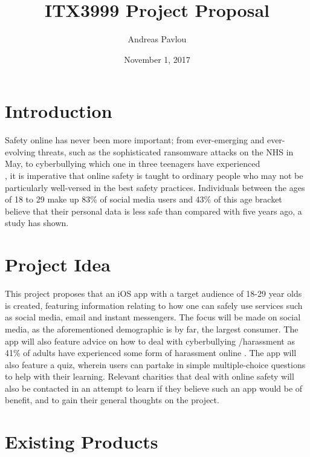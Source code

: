 \documentclass{article}
\author{Andreas Pavlou}
\title{ITX3999 Project Proposal}
\date{November 1, 2017}
\begin{document}
\maketitle
\newpage



\section{Introduction}

Safety online has never been more important; from ever-emerging and ever-evolving threats, such as the sophisticated ransomware attacks on the NHS in May, to cyberbullying which one in three teenagers have experienced \\
\cite{association_number_2014}, it is imperative that online safety is taught to ordinary people who may not be particularly well-versed in the best safety practices. Individuals between the ages of 18 to 29 make up 83\% of social media users and 43\% of this age bracket believe that their personal data is less safe than compared with five years ago, a study  \cite{pew_research_2012} has shown. 



\section{Project Idea}

This project proposes that an iOS app with a target audience of 18-29 year olds is created, featuring information relating to how one can safely use services such as social media, email and instant messengers. The focus will be made on social media, as the aforementioned demographic is by far, the largest consumer. The app will also feature advice on how to deal with cyberbullying /harassment as 41\% of adults have experienced some form of harassment online \cite{duggan_online_2017}. The app will also feature a quiz, wherein users can partake in simple multiple-choice questions to help with their learning. Relevant charities that deal with online safety will also be contacted in an attempt to learn if they believe such an app would be of benefit, and to gain their general thoughts on the project.

\section{Existing Products} 
\end{document}
